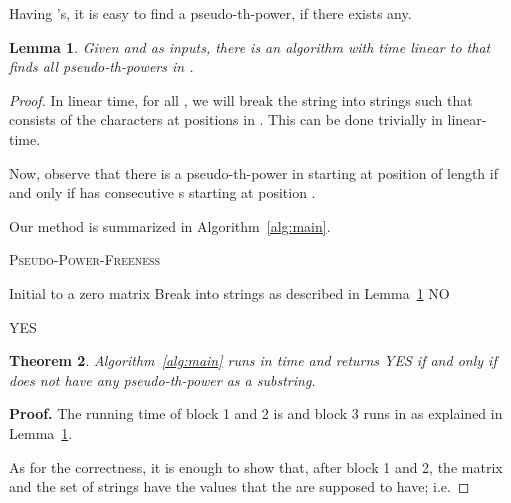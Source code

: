 \documentclass[12pt]{article}
\newtheorem{theorem}{Theorem}
\newtheorem{lemma}[theorem]{Lemma}
\begin{document}
Having 's, it is easy to find a pseudo-th-power, if there exists any.
    \begin{lemma}\label{lem:two-to-k}
      Given  and  as inputs, there is an algorithm with
      time linear to  that finds {\em all} pseudo-th-powers in .
    \end{lemma}
\begin{proof}
      In linear time, for all , we will break the string  into  strings  such that  consists of the characters at positions  in
      .
This can be done trivially in linear-time.

      Now, observe that there is a pseudo-th-power in  starting at position  of length
       if and
      only if  has  consecutive s starting at position
      .
    \hfill

    Our method is summarized in Algorithm~\ref{alg:main}.

    \begin{algorithm}
      \label{alg:main}
      \caption{\textsc{Pseudo-Power-Freeness}}
      Initial  to a zero matrix\;
       {
        \lIf{} {}\;
        \lIf{} {}\;
      }
      \SetVline
      \nl{}
      \SetVline
      \nl{} {
        \SetNoline
        \;
      }
      \SetVline
      \nl{} {
        \SetNoline
        Break  into  strings  as described in
        Lemma~\ref{lem:two-to-k}\;
        {\Return NO\;}
      }

      \Return YES\;
    \end{algorithm}

  \begin{theorem}
    Algorithm~\ref{alg:main} runs in time  and returns YES if and only if  does not have any pseudo-th-power as
    a substring.
  \end{theorem}
  {\noindent\bf Proof.}
    The running time of block 1 and 2 is  and block 3 runs in  as explained in
    Lemma~\ref{lem:two-to-k}.

    As for the correctness, it is enough to show that, after block 1 and 2, the matrix  and the set of strings
     have the values that the are supposed to have; i.e.
    

\end{proof}
\end{document}
